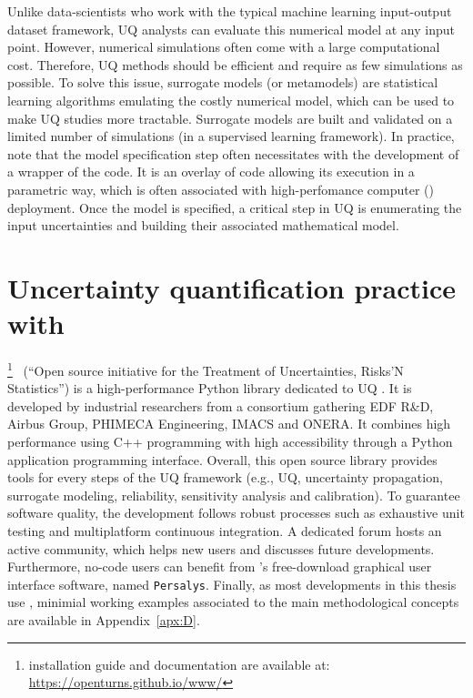 Unlike data-scientists who work with the typical machine learning input-output dataset framework, UQ analysts can evaluate this numerical model at any input point. 
However, numerical simulations often come with a large computational cost. 
Therefore, UQ methods should be efficient and require as few simulations as possible. 
To solve this issue, surrogate models (or metamodels) are statistical learning algorithms emulating the costly numerical model, which can be used to make UQ studies more tractable. 
Surrogate models are built and validated on a limited number of simulations (in a supervised learning framework). 
In practice, note that the model specification step often necessitates with the development of a wrapper of the code. 
It is an overlay of code allowing its execution in a parametric way, which is often associated with high-perfomance computer () deployment.  
Once the model is specified, a critical step in UQ is enumerating the input uncertainties and building their associated mathematical model.


\section{Uncertainty quantification practice with \ot}
\ot\footnote{{\ots installation guide and documentation are available at: \url{https://openturns.github.io/www/}}}~ (``Open source initiative for the Treatment of Uncertainties, Risks’N Statistics'') is a high-performance Python library dedicated to UQ \citep{baudin_dutfoy_2017}. 
It is developed by industrial researchers from a consortium gathering EDF R\&D, Airbus Group, PHIMECA Engineering, IMACS and ONERA. 
It combines high performance using C++ programming with high accessibility through a Python application programming interface. 
Overall, this open source library provides tools for every steps of the UQ framework (e.g., UQ, uncertainty propagation, surrogate modeling, reliability, sensitivity analysis and calibration). 
To guarantee software quality, the development follows robust processes such as exhaustive unit testing and multiplatform continuous integration. 
A dedicated forum hosts an active community, which helps new users and discusses future developments. 
Furthermore, no-code users can benefit from \texttt{}'s free-download graphical user interface software, named \texttt{Persalys}\footnotemark. 
Finally, as most developments in this thesis use \ot, minimial working examples associated to the main methodological concepts are available in Appendix~\ref{apx:D}.  

